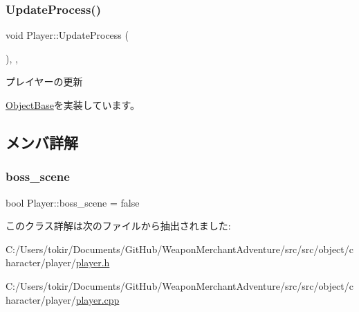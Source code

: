 \subsubsection{\texorpdfstring{Update\+Process()}{UpdateProcess()}}
{\footnotesize\ttfamily void Player\+::\+Update\+Process (\begin{DoxyParamCaption}{ }\end{DoxyParamCaption})\hspace{0.3cm}{\ttfamily [final]}, {\ttfamily [protected]}, {\ttfamily [virtual]}}



プレイヤーの更新 



\mbox{\hyperlink{class_object_base_a8b5b72b363a419767efde0b0e692ea95}{Object\+Base}}を実装しています。



\subsection{メンバ詳解}
\mbox{\label{class_player_adf34c7a3a58c3f8e7f7201ed962a03f0}} 
\subsubsection{\texorpdfstring{boss\+\_\+scene}{boss\_scene}}
{\footnotesize\ttfamily bool Player\+::boss\+\_\+scene = false}



このクラス詳解は次のファイルから抽出されました\+:\begin{DoxyCompactItemize}
\item 
C\+:/\+Users/tokir/\+Documents/\+Git\+Hub/\+Weapon\+Merchant\+Adventure/src/src/object/character/player/\mbox{\hyperlink{player_8h}{player.\+h}}\item 
C\+:/\+Users/tokir/\+Documents/\+Git\+Hub/\+Weapon\+Merchant\+Adventure/src/src/object/character/player/\mbox{\hyperlink{player_8cpp}{player.\+cpp}}\end{DoxyCompactItemize}
